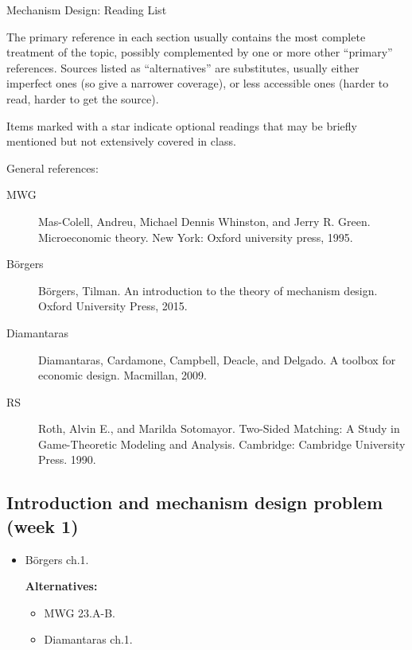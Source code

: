 \documentclass{article}
\begin{document}
\begin{center}
	{\huge Mechanism Design: Reading List}
\end{center}
\bigskip

The primary reference in each section usually contains the most complete treatment of the topic, possibly complemented by one or more other ``primary'' references. Sources listed as ``alternatives'' are substitutes, usually either imperfect ones (so give a narrower coverage), or less accessible ones (harder to read, harder to get the source). 

Items marked with a star indicate optional readings that may be briefly mentioned but not extensively covered in class.

General references:
\begin{description}
	\item[MWG] Mas-Colell, Andreu, Michael Dennis Whinston, and Jerry R. Green. Microeconomic theory. New York: Oxford university press, 1995. 
	\item[B{\"o}rgers] B{\"o}rgers, Tilman. An introduction to the theory of mechanism design. Oxford University Press, 2015.
	\item[Diamantaras] Diamantaras, Cardamone, Campbell, Deacle, and Delgado. A toolbox for economic design. Macmillan, 2009.
	\item[RS] Roth, Alvin E., and Marilda Sotomayor. Two-Sided Matching: A Study in Game-Theoretic Modeling and Analysis. Cambridge: Cambridge University Press. 1990.
\end{description}
\medskip

\subsection{Introduction and mechanism design problem (week 1)}
\begin{itemize}
	\item B{\"o}rgers ch.1.
	
	\textbf{Alternatives:}
	\begin{itemize}
		\item MWG 23.A-B.
		\item Diamantaras ch.1.
	\end{itemize}
\end{itemize}
\end{document}
